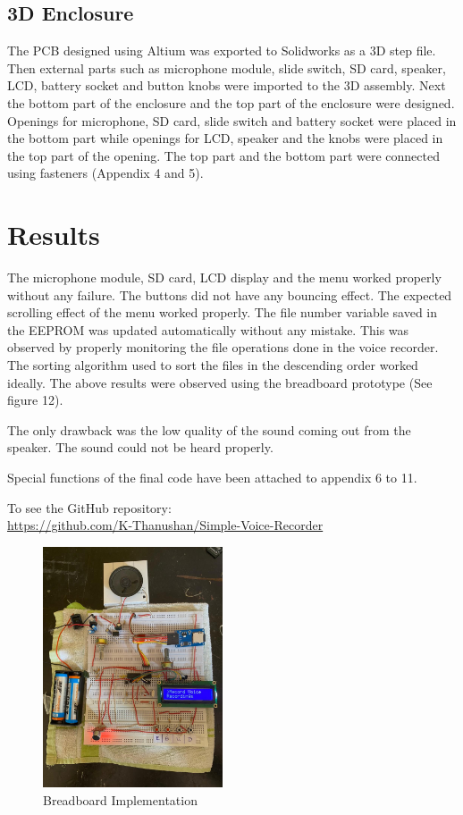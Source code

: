 \documentclass[11pt]{article}
\begin{document}
\subsection{3D Enclosure}
The PCB designed using Altium was exported to Solidworks as a 3D step file. Then external parts such as microphone module, slide switch, SD card, speaker, LCD, battery socket and button knobs were imported to the 3D assembly.
Next the bottom part of the enclosure and the top part of the enclosure were designed. Openings for microphone, SD card, slide switch and battery socket were placed in the bottom part while openings for LCD, speaker and the knobs were placed in the top part of the opening. The top part and the bottom part were connected using fasteners (Appendix 4 and 5).


\section{Results}
The microphone module, SD card, LCD display and the menu worked properly without any failure. The buttons did not have any bouncing effect. The expected scrolling effect of the menu worked properly. The file number variable saved in the EEPROM was updated automatically without any mistake. This was observed by properly monitoring the file operations done in the voice recorder. The sorting algorithm used to sort the files in the descending order worked ideally. The above results were observed using the breadboard prototype (See figure 12). 

The only drawback was the low quality of the sound coming out from the speaker. The sound could not be heard properly. 

Special functions of the final code have been attached to appendix 6 to 11. 

To see the GitHub repository: \\
\url{https://github.com/K-Thanushan/Simple-Voice-Recorder}

\begin{figure}
    \centering
    \includegraphics[width=0.475\textwidth]{Images/imple.jpeg}
    \caption{Breadboard Implementation}
\end{figure}
\end{document}

